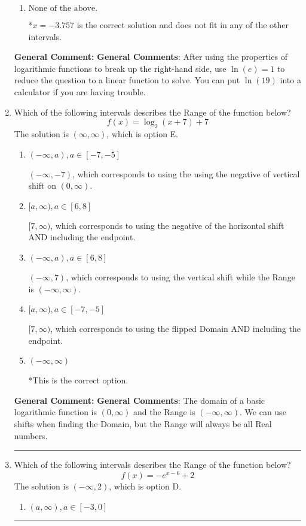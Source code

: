 \documentclass{extbook}[14pt]
\newcommand{\litem}[1]{\item #1

\rule{\textwidth}{0.4pt}}
\begin{document}
\begin{enumerate}
{\begin{enumerate}[label=\Alph*.]
This corresponds to believing you cannot solve the equation.
\item \( \text{None of the above.} \)

*$x = -3.757$ is the correct solution and does not fit in any of the other intervals.
\end{enumerate}

\textbf{General Comment:} \textbf{General Comments}: After using the properties of logarithmic functions to break up the right-hand side, use $\ln(e) = 1$ to reduce the question to a linear function to solve. You can put $\ln(19)$ into a calculator if you are having trouble.
}
\litem{
Which of the following intervals describes the Range of the function below?
\[ f(x) = \log_2{(x+7)}+7 \]The solution is \( (\infty, \infty) \), which is option E.\begin{enumerate}[label=\Alph*.]
\item \( (-\infty, a), a \in [-7, -5] \)

$(-\infty, -7)$, which corresponds to using the using the negative of vertical shift on $(0, \infty)$.
\item \( [a, \infty), a \in [6, 8] \)

$[7, \infty)$, which corresponds to using the negative of the horizontal shift AND including the endpoint.
\item \( (-\infty, a), a \in [6, 8] \)

$(-\infty, 7)$, which corresponds to using the vertical shift while the Range is $(-\infty, \infty)$.
\item \( [a, \infty), a \in [-7, -5] \)

$[7, \infty)$, which corresponds to using the flipped Domain AND including the endpoint.
\item \( (-\infty, \infty) \)

*This is the correct option.
\end{enumerate}

\textbf{General Comment:} \textbf{General Comments}: The domain of a basic logarithmic function is $(0, \infty)$ and the Range is $(-\infty, \infty)$. We can use shifts when finding the Domain, but the Range will always be all Real numbers.
}
\litem{
Which of the following intervals describes the Range of the function below?
\[ f(x) = -e^{x-6}+2 \]The solution is \( (-\infty, 2) \), which is option D.\begin{enumerate}[label=\Alph*.]
\item \( (a, \infty), a \in [-3, 0] \)


\end{enumerate}}
\end{enumerate}
\end{document}
